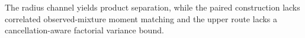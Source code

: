 The radius channel yields product separation, while the paired construction lacks correlated observed-mixture moment matching and the upper route lacks a cancellation-aware factorial variance bound.